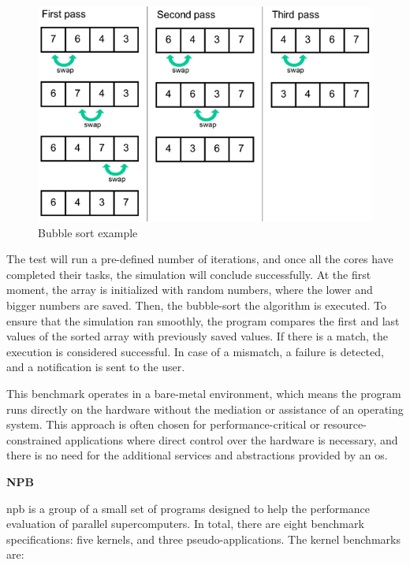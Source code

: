 \begin{figure}[H]
	\centering
 	\includegraphics[width=0.6\linewidth]{Images/bubble_sort.png}
 	\caption{Bubble sort example}
	 \label{fig_bubble_sort}
\end{figure}

The test will run a pre-defined number of iterations, and 
once all the cores have completed their tasks, the simulation will conclude successfully. At the first moment, the array 
is initialized with random numbers, where the lower and bigger numbers are saved. Then, the bubble-sort 
the algorithm is executed. To ensure that the simulation ran smoothly, the program compares the first and last values of 
the sorted array with previously saved values. If there is a match, the execution is considered successful. In case of a 
mismatch, a failure is detected, and a notification is sent to the user.

This benchmark operates in a bare-metal environment, which means the program runs directly on the hardware without the mediation or 
assistance of an operating system. This approach is often chosen for 
performance-critical or resource-constrained applications where direct control over the hardware is necessary, and there is no need for the 
additional services and abstractions provided by an \gls{os}.
\newline

\textbf{NPB}
\newline

\gls{npb} \cite{bailey1994parallel} is a group of a small set of programs designed to help the performance evaluation of parallel 
supercomputers. In total, there are eight benchmark specifications: five kernels, and three pseudo-applications. The kernel benchmarks are:

